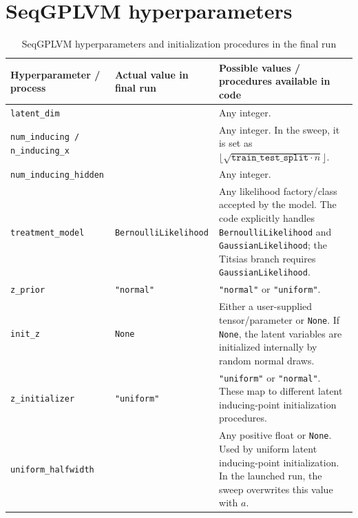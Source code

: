 \section{SeqGPLVM hyperparameters}

\begin{table}[htbp]
\centering
\footnotesize
\renewcommand{\arraystretch}{1.2}
\begin{threeparttable}
\caption{SeqGPLVM hyperparameters and initialization procedures in the final run}
\label{tab:seqgplvm_hparams_final}
\begin{tabularx}{\textwidth}{
    >{\raggedright\arraybackslash}p{}
    >{\raggedright\arraybackslash}p{}
    >{\raggedright\arraybackslash}X
}
\toprule
\textbf{Hyperparameter / process} & \textbf{Actual value in final run} & \textbf{Possible values / procedures available in code} \\
\midrule

\texttt{latent\_dim}
& 1
& Any integer. \\

\texttt{num\_inducing / n\_inducing\_x}
& 31
& Any integer. In the sweep, it is set as
\(\lfloor \sqrt{\texttt{train\_test\_split} \cdot n} \rfloor\). \\

\texttt{num\_inducing\_hidden}
& 13
& Any integer. \\

\texttt{treatment\_model}
& \texttt{BernoulliLikelihood}
& Any likelihood factory/class accepted by the model. The code explicitly handles \texttt{BernoulliLikelihood} and \texttt{GaussianLikelihood}; the Titsias branch requires \texttt{GaussianLikelihood}. \\

\texttt{z\_prior}
& \texttt{"normal"}
& \texttt{"normal"} or \texttt{"uniform"}. \\

\texttt{init\_z}
& \texttt{None}
& Either a user-supplied tensor/parameter or \texttt{None}. If \texttt{None}, the latent variables are initialized internally by random normal draws. \\

\texttt{z\_initializer}
& \texttt{"uniform"}
& \texttt{"uniform"} or \texttt{"normal"}. These map to different latent inducing-point initialization procedures. \\

\texttt{uniform\_halfwidth}
& 1
& Any positive float or \texttt{None}. Used by uniform latent inducing-point initialization. In the launched run, the sweep overwrites this value with \(a\). \\


\end{tabularx}
\end{threeparttable}
\end{table}

